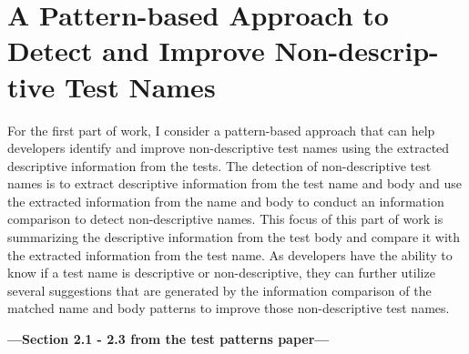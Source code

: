 \section{A Pattern-based Approach to Detect and Improve Non-descrip-\\tive Test Names}
\label{sec:test-pattern-section}

For the first part of work, I consider a pattern-based approach that can help developers identify and improve non-descriptive test names using the extracted descriptive information from the tests.
%
The detection of non-descriptive test names is to extract descriptive information from the test name and body and use the extracted information  from the name and body to conduct an information comparison to detect non-descriptive names.
%
This focus of this part of work is summarizing the descriptive information from the test body and compare it with the extracted information from the test name.
%
As developers have the ability to know if a test name is descriptive or non-descriptive, they can further utilize several suggestions that are generated by the information comparison of the matched name and body patterns to improve those non-descriptive test names.

\textbf{---Section 2.1 - 2.3 from the test patterns paper---}






